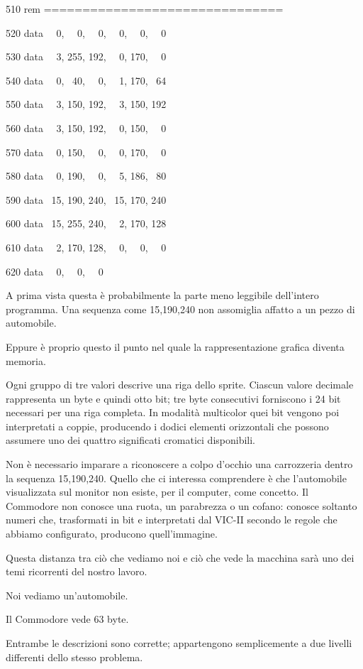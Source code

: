 \documentclass{article}
\begin{document}
510 rem ===============================

520 data \ \ 0, \ \ 0, \ \ 0, \ \ 0, \ \ 0, \ \ 0

530 data \ \ 3, 255, 192, \ \ 0, 170, \ \ 0

540 data \ \ 0, \ 40, \ \ 0, \ \ 1, 170, \ 64

550 data \ \ 3, 150, 192, \ \ 3, 150, 192

560 data \ \ 3, 150, 192, \ \ 0, 150, \ \ 0

570 data \ \ 0, 150, \ \ 0, \ \ 0, 170, \ \ 0

580 data \ \ 0, 190, \ \ 0, \ \ 5, 186, \ 80

590 data \ 15, 190, 240, \ 15, 170, 240

600 data \ 15, 255, 240, \ \ 2, 170, 128

610 data \ \ 2, 170, 128, \ \ 0, \ \ 0, \ \ 0

620 data \ \ 0, \ \ 0, \ \ 0

A prima vista questa è probabilmente la parte meno leggibile dell'intero programma. Una sequenza come 15,190,240 non
assomiglia affatto a un pezzo di automobile.

Eppure è proprio questo il punto nel quale la rappresentazione grafica diventa memoria.

Ogni gruppo di tre valori descrive una riga dello sprite. Ciascun valore decimale rappresenta un byte e quindi otto bit;
tre byte consecutivi forniscono i 24 bit necessari per una riga completa. In modalità multicolor quei bit vengono poi
interpretati a coppie, producendo i dodici elementi orizzontali che possono assumere uno dei quattro significati
cromatici disponibili.

Non è necessario imparare a riconoscere a colpo d'occhio una carrozzeria dentro la sequenza 15,190,240. Quello che ci
interessa comprendere è che l'automobile visualizzata sul monitor non esiste, per il computer, come concetto. Il
Commodore non conosce una ruota, un parabrezza o un cofano: conosce soltanto numeri che, trasformati in bit e
interpretati dal VIC-II secondo le regole che abbiamo configurato, producono quell'immagine.

Questa distanza tra ciò che vediamo noi e ciò che vede la macchina sarà uno dei temi ricorrenti del nostro lavoro.

Noi vediamo un'automobile.

Il Commodore vede 63 byte.

Entrambe le descrizioni sono corrette; appartengono semplicemente a due livelli differenti dello stesso problema.
\end{document}
